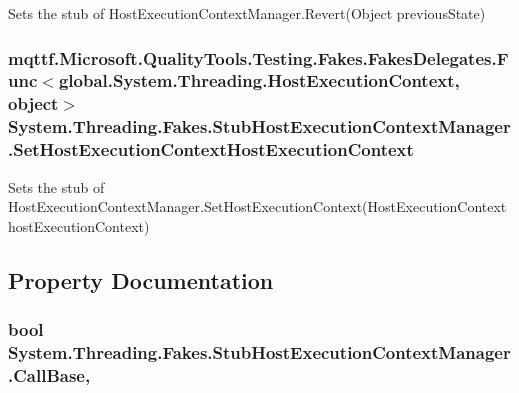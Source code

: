 Sets the stub of Host\-Execution\-Context\-Manager.\-Revert(\-Object previous\-State)

\hypertarget{class_system_1_1_threading_1_1_fakes_1_1_stub_host_execution_context_manager_a8b01dd91845f100685fef0c2be04c9f7}{
\subsubsection[{Set\-Host\-Execution\-Context\-Host\-Execution\-Context}]{\setlength{\rightskip}{0pt plus 5cm}mqttf.\-Microsoft.\-Quality\-Tools.\-Testing.\-Fakes.\-Fakes\-Delegates.\-Func$<$global.\-System.\-Threading.\-Host\-Execution\-Context, object$>$ System.\-Threading.\-Fakes.\-Stub\-Host\-Execution\-Context\-Manager.\-Set\-Host\-Execution\-Context\-Host\-Execution\-Context}}\label{class_system_1_1_threading_1_1_fakes_1_1_stub_host_execution_context_manager_a8b01dd91845f100685fef0c2be04c9f7}


Sets the stub of Host\-Execution\-Context\-Manager.\-Set\-Host\-Execution\-Context(\-Host\-Execution\-Context host\-Execution\-Context)



\subsection{Property Documentation}
\hypertarget{class_system_1_1_threading_1_1_fakes_1_1_stub_host_execution_context_manager_a4c735ff15aeadfd3ba0be714b744abca}{
\subsubsection[{Call\-Base}]{\setlength{\rightskip}{0pt plus 5cm}bool System.\-Threading.\-Fakes.\-Stub\-Host\-Execution\-Context\-Manager.\-Call\-Base\hspace{0.3cm}{\ttfamily [get]}, {\ttfamily [set]}}}\label{class_system_1_1_threading_1_1_fakes_1_1_stub_host_execution_context_manager_a4c735ff15aeadfd3ba0be714b744abca}


